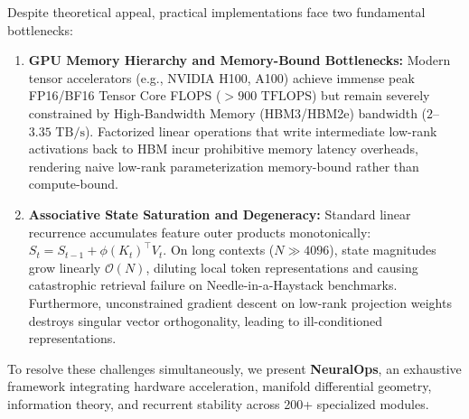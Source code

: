 Despite theoretical appeal, practical implementations face two fundamental bottlenecks:
\begin{enumerate}
    \item \textbf{GPU Memory Hierarchy and Memory-Bound Bottlenecks:} Modern tensor accelerators (e.g., NVIDIA H100, A100) achieve immense peak FP16/BF16 Tensor Core FLOPS ($>900\text{ TFLOPS}$) but remain severely constrained by High-Bandwidth Memory (HBM3/HBM2e) bandwidth ($2$--$3.35\text{ TB/s}$). Factorized linear operations that write intermediate low-rank activations back to HBM incur prohibitive memory latency overheads, rendering naive low-rank parameterization memory-bound rather than compute-bound.
    \item \textbf{Associative State Saturation and Degeneracy:} Standard linear recurrence accumulates feature outer products monotonically: $S_t = S_{t-1} + \phi(K_t)^\top V_t$. On long contexts ($N \gg 4096$), state magnitudes grow linearly $\mathcal{O}(N)$, diluting local token representations and causing catastrophic retrieval failure on Needle-in-a-Haystack benchmarks. Furthermore, unconstrained gradient descent on low-rank projection weights destroys singular vector orthogonality, leading to ill-conditioned representations.
\end{enumerate}

To resolve these challenges simultaneously, we present \textbf{NeuralOps}, an exhaustive framework integrating hardware acceleration, manifold differential geometry, information theory, and recurrent stability across 200+ specialized modules.

